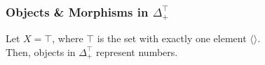 \documentclass[aspectratio=169]{beamer}
\theoremstyle{remarkstyle}
\begin{document}
\begin{frame}[fragile]
  \frametitle{Objects \& Morphisms in $Δ_+^⊤$}
  \begin{example}
    Let $X = ⊤$, where $⊤$ is the set with exactly one element $⟨⟩$.\\ Then, objects in $Δ_+^⊤$ represent numbers. 
    \begin{columns}
      \begin{column}{0.6\textwidth}
        \begin{center}
        \end{center}
      \end{column}
      \begin{column}{0.4\textwidth}
        \begin{center}
        \end{center}
      \end{column}
    \end{columns}
  \end{example}
\end{frame}
\end{document}
